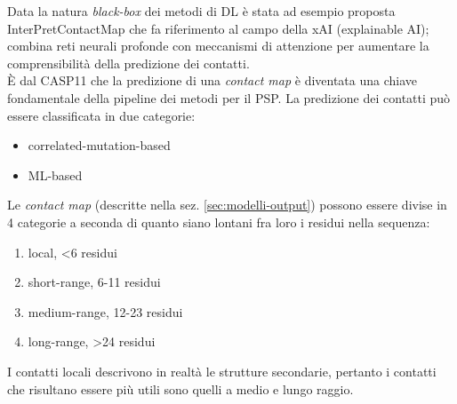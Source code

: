 \par Data la natura \textit{black-box} dei metodi di DL è stata ad esempio proposta InterPretContactMap che fa riferimento al campo della xAI (explainable AI); combina reti neurali profonde con meccanismi di attenzione per aumentare la comprensibilità della predizione dei contatti. \\

È dal CASP11 che la predizione di una \textit{contact map} è diventata una chiave fondamentale della pipeline dei metodi per il PSP. La predizione dei contatti può essere classificata in due categorie:

\begin{itemize}
	\item correlated-mutation-based
	\item ML-based
\end{itemize}

Le \textit{contact map} (descritte nella sez. \ref{sec:modelli-output}) possono essere divise in 4 categorie a seconda di quanto siano lontani fra loro i residui nella sequenza:

\begin{enumerate}
	\item local, <6 residui
	\item short-range, 6-11 residui
	\item medium-range, 12-23 residui
	\item long-range, >24 residui
\end{enumerate}

I contatti locali descrivono in realtà le strutture secondarie, pertanto i contatti che risultano essere più utili sono quelli a medio e lungo raggio.

